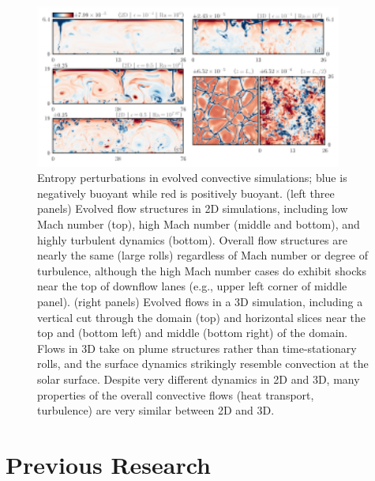 \documentclass[preprint, hmargin=1in, vmargin=1in]{aastex62}
\begin{document}
\begin{figure}[t!]
	\vspace{-6pt}
	\begin{center}
    \includegraphics[width=0.9\textwidth]{./figs/snapshots_fig.pdf}
	\end{center}
	\vspace{-25pt}
    \caption{ 
	\citep[Fig.~2 of][]{anders&brown2017} Entropy perturbations in evolved convective simulations; blue is negatively buoyant while red is positively buoyant.
	(left three panels) Evolved flow structures in 2D simulations, including low Mach number (top), high Mach number (middle and bottom), and highly turbulent dynamics (bottom).
	Overall flow structures are nearly the same (large rolls) regardless of Mach number or degree of turbulence, although the high Mach number cases do exhibit shocks near the top of downflow lanes (e.g., upper left corner of middle panel).
	(right panels) Evolved flows in a 3D simulation, including a vertical cut through the domain (top) and horizontal slices near the top and (bottom left) and middle (bottom right) of the domain.
	Flows in 3D take on plume structures rather than time-stationary rolls, and the surface dynamics strikingly resemble convection at the solar surface.
	Despite very different dynamics in 2D and 3D, many properties of the overall convective flows (heat transport, turbulence) are very similar between 2D and 3D.
	\label{fig:ab17} }
	\vspace{-66pt}
\end{figure}
\section*{\textbf{Previous Research}}
\thispagestyle{fancy}
\end{document}
